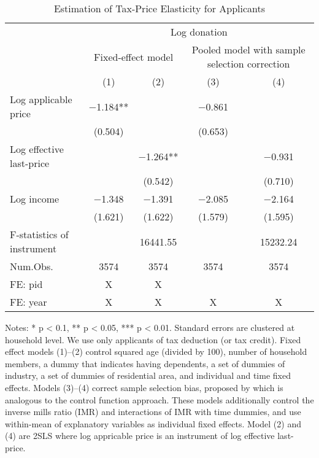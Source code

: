 \begin{table}

\caption{Estimation of Tax-Price Elasticity for Applicants\label{tab:fe2sls-applicants}}
\centering
\fontsize{8}{10}\selectfont
\begin{threeparttable}
\begin{tabular}[t]{lcccc}
\toprule
\multicolumn{1}{c}{ } & \multicolumn{4}{c}{Log donation} \\
\cmidrule(l{3pt}r{3pt}){2-5}
\multicolumn{1}{c}{ } & \multicolumn{2}{c}{Fixed-effect model} & \multicolumn{2}{c}{Pooled model with sample selection correction} \\
\cmidrule(l{3pt}r{3pt}){2-3} \cmidrule(l{3pt}r{3pt}){4-5}
  & (1) & (2) & (3) & (4)\\
\midrule
Log applicable price & \num{-1.184}** &  & \num{-0.861} & \\
 & (\num{0.504}) &  & (\num{0.653}) & \\
Log effective last-price &  & \num{-1.264}** &  & \num{-0.931}\\
 &  & (\num{0.542}) &  & (\num{0.710})\\
Log income & \num{-1.348} & \num{-1.391} & \num{-2.085} & \num{-2.164}\\
 & (\num{1.621}) & (\num{1.622}) & (\num{1.579}) & (\num{1.595})\\
\midrule
F-statistics of instrument &  & 16441.55 &  & 15232.24\\
Num.Obs. & \num{3574} & \num{3574} & \num{3574} & \num{3574}\\
FE: pid & X & X &  & \\
FE: year & X & X & X & X\\
\bottomrule
\end{tabular}
\begin{tablenotes}
\item Notes: * p < 0.1, ** p < 0.05, *** p < 0.01. Standard errors are clustered at household level. We use only applicants of tax deduction (or tax credit). Fixed effect models (1)--(2) control squared age (divided by 100), number of household members, a dummy that indicates having dependents, a set of dummies of industry, a set of dummies of residential area, and individual and time fixed effects. Models (3)--(4) correct sample selection bias, proposed by \cite{Semykina2010} which is analogous to the control function approach. These models additionally control the inverse mills ratio (IMR) and interactions of IMR with time dummies, and use within-mean of explanatory variables as individual fixed effects. Model (2) and (4) are 2SLS where log appricable price is an instrument of log effective last-price.
\end{tablenotes}
\end{threeparttable}
\end{table}
